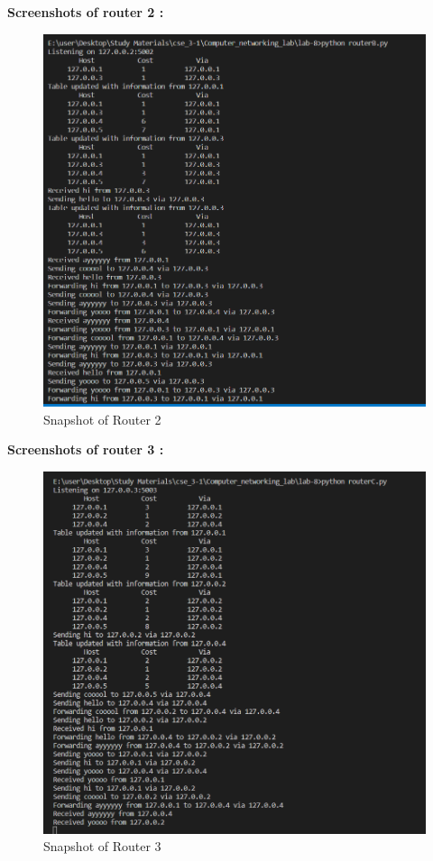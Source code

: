 \documentclass[11pt]{article}
\begin{document}
\textbf{Screenshots of router 2 : }\\[12pt]
 \begin{figure}[!h]
\centering
\includegraphics[width=\textwidth]{rB.png}
\caption{Snapshot of Router 2}
\end{figure}
\FloatBarrier

\textbf{Screenshots of router 3 : }\\[12pt]
 \begin{figure}[!h]
\centering
\includegraphics[width=\textwidth]{rC.png}
\caption{Snapshot of Router 3}
\end{figure}
\FloatBarrier
\end{document}
